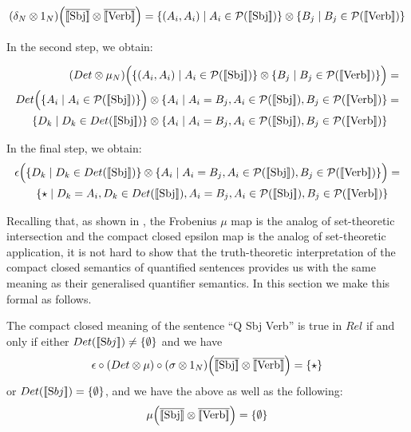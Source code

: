 \begin{align*}
(\delta_N \otimes 1_{N})\Big(\overline{\semantics{\text{Sbj}}} \otimes \overline{\semantics{\text{Verb}}}\Big) =  \{(A_i, A_i) \mid A_i \in {\cal P} (\semantics{\text{Sbj}})\} \otimes \{B_j \mid B_j \in  {\cal P} (\semantics{\text{Verb}})\}
\end{align*}


\noindent
In the second step, we obtain:

\begin{align*}
(Det \otimes  \mu_N)\Big(\{(A_i, A_i) \mid A_i \in {\cal P} (\semantics{\text{Sbj}})\} \otimes \{B_j \mid B_j \in  {\cal P} (\semantics{\text{Verb}})\}\Big) &=\\
Det\Big(\{A_i \mid A_i \in {\cal P} (\semantics{\text{Sbj}})\}\Big) \otimes \{A_i \mid A_i = B_j, A_i \in {\cal P} (\semantics{\text{Sbj}}), B_j \in  {\cal P}(\semantics{\text{Verb}})\} &=\\
\{D_k \mid D_k \in Det(\semantics{\text{Sbj}})\} \otimes \{A_i \mid A_i = B_j, A_i \in {\cal P} (\semantics{\text{Sbj}}), B_j \in  {\cal P}(\semantics{\text{Verb}})\}
\end{align*}

\noindent
In the final step, we obtain:
\begin{align*}
\epsilon\Big(\{D_k \mid D_k \in Det(\semantics{\text{Sbj}})\} \otimes \{A_i \mid A_i = B_j, A_i \in {\cal P} (\semantics{\text{Sbj}}), B_j \in  {\cal P}(\semantics{\text{Verb}})\}\Big) &=\\
 \{\star \mid  D_k = A_i, D_k \in Det(\semantics{\text{Sbj}}), A_i = B_j, A_i \in {\cal P} (\semantics{\text{Sbj}}), B_j \in  {\cal P} (\semantics{\text{Verb}})\}
\end{align*}




Recalling that, as shown in \cite{CoeckePaquettePavlovic09,CoeckePaq},  the Frobenius $ \mu$ map is the analog of  set-theoretic intersection and the compact closed  epsilon map is the analog of  set-theoretic application, it is not hard to show that  the truth-theoretic interpretation of the compact closed semantics of quantified sentences provides us with the same meaning as their generalised quantifier semantics. In this section we make this formal as follows.

\begin{definition}
\label{deftrue}
The compact closed meaning of the sentence ``Q Sbj Verb'' is true  in $Rel$ if and only if either $Det([\![ \text Sbj ]\!]) \neq \{\emptyset\}$ and we have 
\[
\epsilon \circ (Det \otimes \mu) \circ (\sigma \otimes 1_N) \Big(\overline{[\![ \text{Sbj} ]\!]} \otimes \overline{[\![ \text{Verb} ]\!]} \Big) = \{\star\} 
\] 
or  $Det([\![ \text Sbj ]\!]) = \{\emptyset\}$,  and we have the above as well as the following: 
\[
\mu \Big(\overline{[\![ \text{Sbj} ]\!]} \otimes \overline{[\![ \text{Verb} ]\!]} \Big) = \{\emptyset\}
\]
\end{definition}


